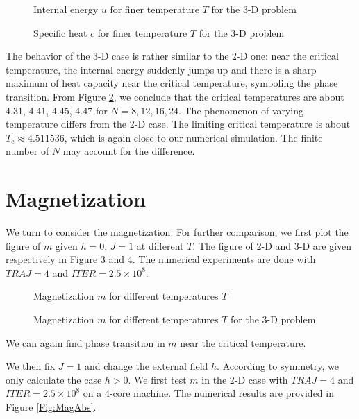 \documentclass[english, nochinese]{pnote}
\begin{document}
\begin{figure}[htbp]
\centering
\scalebox{0.725}{}
\caption{Internal energy $u$ for finer temperature $T$ for the 3-D problem}
\label{Fig:HeatBig3D}
\end{figure}

\begin{figure}[htbp]
\centering
\scalebox{0.725}{}
\caption{Specific heat $c$ for finer temperature $T$ for the 3-D problem}
\label{Fig:CapBig3D}
\end{figure}

The behavior of the 3-D case is rather similar to the 2-D one: near the critical temperature, the internal energy suddenly jumps up and there is a sharp maximum of heat capacity near the critical temperature, symboling the phase transition. From Figure \ref{Fig:CapBig3D}, we conclude that the critical temperatures are about 4.31, 4.41, 4.45, 4.47 for $ N = 8, 12, 16, 24 $. The phenomenon of varying temperature differs from the 2-D case. The limiting critical temperature is about $ T_{\text{c}} \approx 4.511536 $, which is again close to our numerical simulation. The finite number of $N$ may account for the difference.

\section{Magnetization}

We turn to consider the magnetization. For further comparison, we first plot the figure of $m$ given $ h = 0 $, $ J = 1 $ at different $T$. The figure of 2-D and 3-D are given respectively in Figure \ref{Fig:MagMag} and \ref{Fig:MagMag3D}. The numerical experiments are done with $ \mathit{TRAJ} = 4 $ and $ \mathit{ITER} = 2.5 \times 10^8 $.

\begin{figure}[htbp]
\centering
\scalebox{0.725}{}
\caption{Magnetization $m$ for different temperatures $T$}
\label{Fig:MagMag}
\end{figure}

\begin{figure}[htbp]
\centering
\scalebox{0.725}{}
\caption{Magnetization $m$ for different temperatures $T$ for the 3-D problem}
\label{Fig:MagMag3D}
\end{figure}

We can again find phase transition in $m$ near the critical temperature.

We then fix $ J = 1 $ and change the external field $h$. According to symmetry, we only calculate the case $ h > 0 $. We first test $m$ in the 2-D case with $ \textit{TRAJ} = 4 $ and $ \textit{ITER} = 2.5 \times 10^8 $ on a 4-core machine. The numerical results are provided in Figure \ref{Fig:MagAbs}.
\end{document}
